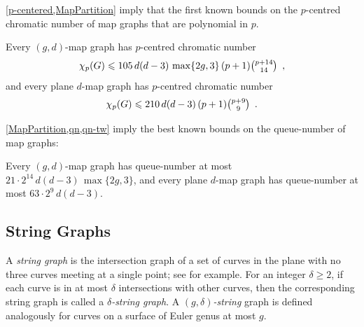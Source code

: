 \documentclass{patmorin}
\newcommand{\note}[2]{{\color{red}[#1:~#2]}}
\DeclareMathOperator{\qn}{qn}
\renewcommand{\le}{\leqslant}
\renewcommand{\geq}{\geqslant}
\begin{document}
\cref{p-centered,MapPartition} imply that the first known bounds on the $p$-centred chromatic number of map graphs that are polynomial in $p$.

\begin{cor}
Every $(g,d)$-map graph has $p$-centred chromatic number  
$$\chi_p(G)\le 105\, d(d-3)\, \max\{2g,3\}\, (p+1) \tbinom{p+14}{14}\enspace,$$
and every plane $d$-map graph has $p$-centred chromatic number  
$$\chi_p(G)\le 210\,d(d-3)\, (p+1) \tbinom{p+9}{9}\enspace.$$
\end{cor}

\cref{MapPartition,qn,qn-tw} imply the best known bounds on the queue-number of map graphs:

\begin{cor}
Every $(g,d)$-map graph has queue-number at most $ 21\cdot 2^{14} \, d(d-3)\, \max\{2g,3\} $, 
and every plane $d$-map graph  has queue-number at most 
$ 63 \cdot 2^9\, d(d-3)$. 
\end{cor}





\subsection{String Graphs}

A \emph{string graph} is the intersection graph of a set of curves in the plane with no three curves meeting at a single point; see  \cite{PachToth-DCG02,FP10,FP14} for example. For an integer $\delta\geq 2$, if each curve is in at most $\delta$ intersections with other curves, then the corresponding string graph is called a \emph{$\delta$-string graph}. A \emph{$(g,\delta)$-string} graph is defined analogously for curves on a surface of Euler genus at most $g$.  
\end{document}
